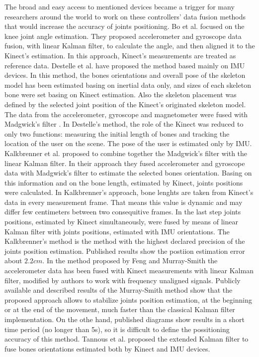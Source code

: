 \documentclass[sensors,article,submit,moreauthors,pdftex,10pt,a4paper]{mdpi}
\begin{document}
The broad and easy access to mentioned devices became a trigger for many researchers around the world to work on these controllers' data fusion methods that would increase the accuracy of joints positioning. Bo et al. \cite{Bo2011a} focused on the knee joint angle estimation. They proposed accelerometer and gyroscope data fusion, with linear Kalman filter, to calculate the angle, and then aligned it to the Kinect’s estimation. In this approach, Kinect's measurements are treated as reference data. Destelle et al. \cite{Destelle2014} have proposed the method based mainly on IMU devices. In this method, the bones orientations and overall pose of the skeleton model has been estimated basing on inertial data only, and sizes of each skeleton bone were set basing on Kinect estimation. Also the skeleton placement was defined by the selected joint position of the Kinect's originated skeleton model. The data from the accelerometer, gyroscope and magnetometer were fused with Madgwick’s filter \cite{Madgwick2011}. In Destelle's method, the role of the Kinect was reduced to only two functions: measuring the initial length of bones and tracking the location of the user on the scene. The pose of the user is estimated only by IMU. Kalkbrenner et al. \cite{Kalkbrenner2014} proposed to combine together the Madgwick’s filter with the linear Kalman filter. In their approach they fused accelerometer and gyroscope data with Madgwick’s filter to estimate the selected bones orientation. Basing on this information and on the bone length, estimated by Kinect, joints positions were calculated. In Kalkbrenner's approach, bone lenghts are taken from Kinect's data in every measurement frame. That means this value is dynamic and may differ few centimeters between two consequitive frames. In the last step joints positions, estimated by Kinect simultaneously, were fused by means of linear Kalman filter with joints positions, estimated with IMU orientations. The Kalkbrenner's method is the method with the highest declared precision of the joints position estimation. Published results show the postiion estimation error about $2.2cm$. In the method proposed by Feng and Murray-Smith \cite{Murray-Smith2014} the accelerometer data has been fused with Kinect measurements with linear Kalman filter, modified by authors to work with frequency unaligned signals. Publicly available and described results of the Murray-Smith method show that the proposed approach allows to stabilize joints position estimation, at the beginning or at the end of the movement, much faster than the classical Kalman filter implementation. On the othe hand, published diagrams show results in a short time period (no longer than 5s), so it is difficult to define the possitioning accuracy of this method. Tannous et al. \cite{Tannous2016} proposed the extended Kalman filter to fuse bones orientations estimated both by Kinect and IMU devices. 
\end{document}
